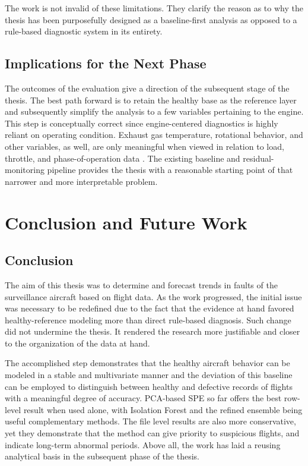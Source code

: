 \documentclass[12pt,a4paper]{report}
\begin{document}
	The work is not invalid of these limitations. They clarify the reason as to why the thesis has been purposefully designed as a baseline-first analysis as opposed to a rule-based diagnostic system in its entirety.
	
	\section{Implications for the Next Phase}
	
	The outcomes of the evaluation give a direction of the subsequent stage of the thesis. The best path forward is to retain the healthy base as the reference layer and subsequently simplify the analysis to a few variables pertaining to the engine. This step is conceptually correct since engine-centered diagnostics is highly reliant on operating condition. Exhaust gas temperature, rotational behavior, and other variables, as well, are only meaningful when viewed in relation to load, throttle, and phase-of-operation data \cite{tumer1999survey,degiorgi2018engine}. The existing baseline and residual-monitoring pipeline provides the thesis with a reasonable starting point of that narrower and more interpretable problem.
	
	\chapter{Conclusion and Future Work}
	
	\section{Conclusion}
	
	The aim of this thesis was to determine and forecast trends in faults of the surveillance aircraft based on flight data. As the work progressed, the initial issue was necessary to be redefined due to the fact that the evidence at hand favored healthy-reference modeling more than direct rule-based diagnosis. Such change did not undermine the thesis. It rendered the research more justifiable and closer to the organization of the data at hand. 
	
	The accomplished step demonstrates that the healthy aircraft behavior can be modeled in a stable and multivariate manner and the deviation of this baseline can be employed to distinguish between healthy and defective records of flights with a meaningful degree of accuracy. PCA-based SPE so far offers the best row-level result when used alone, with Isolation Forest and the refined ensemble being useful complementary methods. The file level results are also more conservative, yet they demonstrate that the method can give priority to suspicious flights, and indicate long-term abnormal periods. Above all, the work has laid a reusing analytical basis in the subsequent phase of the thesis.
	
\end{document}

